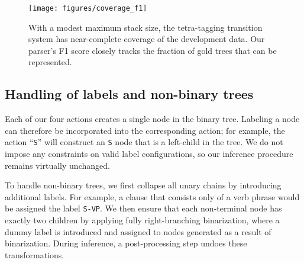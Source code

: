\documentclass[11pt,a4paper]{article}
\newcommand{\xL}[0]{\rotatebox[origin=c]{45}{$\Rightarrow$}}
\begin{document}
\begin{table}[t]
\begin{center}
\end{center}
\caption{\label{table:results} Comparison of F1 scores and inference speeds on the WSJ test set. $^*$Models using BERT$_\texttt{LARGE}$ \citep{devlin-etal-2019-bert} word representations fine-tuned from the same initial parameters.}
\end{table}

\begin{figure}[t]
\centering
\texttt{[image: figures/coverage\_f1]}
\vspace{-9pt}
\caption{\label{fig:coverage} With a modest maximum stack size, the tetra-tagging transition system has near-complete coverage of the development data. Our parser's F1 score closely tracks the fraction of gold trees that can be represented.}
\end{figure}

\subsection{Handling of labels and non-binary trees}
\label{subsec:nary}

Each of our four actions creates a single node in the binary tree. Labeling a node can therefore be incorporated into the corresponding action; for example, the action ``\xL\texttt{S}'' will construct an \texttt{S} node that is a left-child in the tree.
We do not impose any constraints on valid label configurations, so our inference procedure remains virtually unchanged.

To handle non-binary trees, we first collapse all unary chains by introducing additional labels. For example, a clause that consists only of a verb phrase would be assigned the label \texttt{S-VP}. We then ensure that each non-terminal node has exactly two children by applying fully right-branching binarization, where a dummy label is introduced and assigned to nodes generated as a result of binarization. During inference, a post-processing step undoes these transformations.
\end{document}
